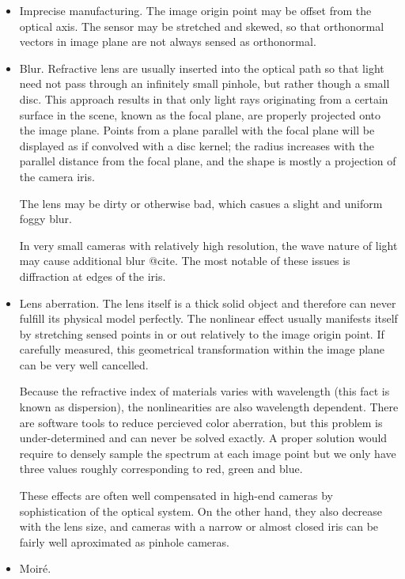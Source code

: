 \begin{itemize}

\item
Imprecise manufacturing.
The image origin point may be offset from the optical axis.
The sensor may be stretched and skewed, so that orthonormal vectors in image plane are not always sensed as orthonormal.

\item
Blur.
Refractive lens are usually inserted into the optical path so that light need not pass through an infinitely small pinhole, but rather though a small disc.
This approach results in that only light rays originating from a certain surface in the scene, known as the focal plane, are properly projected onto the image plane.
Points from a plane parallel with the focal plane will be displayed as if convolved with a disc kernel; the radius increases with the parallel distance from the focal plane, and the shape is mostly a projection of the camera iris.

The lens may be dirty or otherwise bad, which casues a slight and uniform foggy blur.

In very small cameras with relatively high resolution, the wave nature of light may cause additional blur @cite.
The most notable of these issues is diffraction at edges of the iris.

\item
Lens aberration.
The lens itself is a thick solid object and therefore can never fulfill its physical model perfectly.
The nonlinear effect usually manifests itself by stretching sensed points in or out relatively to the image origin point.
If carefully measured, this geometrical transformation within the image plane can be very well cancelled.

Because the refractive index of materials varies with wavelength (this fact is known as dispersion), the nonlinearities are also wavelength dependent.
There are software tools to reduce percieved color aberration, but this problem is under-determined and can never be solved exactly.
A proper solution would require to densely sample the spectrum at each image point but we only have three values roughly corresponding to red, green and blue.

These effects are often well compensated in high-end cameras by sophistication of the optical system.
On the other hand, they also decrease with the lens size, and cameras with a narrow or almost closed iris can be fairly well aproximated as pinhole cameras.

\item
Moiré.

\end{itemize}

